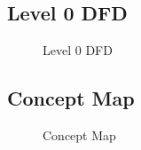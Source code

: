 \documentclass[
  english,
  a4paper,
,tablecaptionabove
]{scrartcl}
\begin{document}
\newpage

\begin{landscape}

\pagestyle{empty}

\hypertarget{level0dfd}{%
\section{Level 0 DFD}\label{level0dfd}}

\begin{figure}
    \caption{Level 0 DFD} \label{fig:level0dfd}
\end{figure}

\end{landscape}

\newpage

\begin{landscape}

\pagestyle{empty}

\hypertarget{cmap}{%
\section{Concept Map}\label{cmap}}

\begin{figure}
    \caption{Concept Map} \label{fig:cmap}
\end{figure}

\end{landscape}
\end{document}
